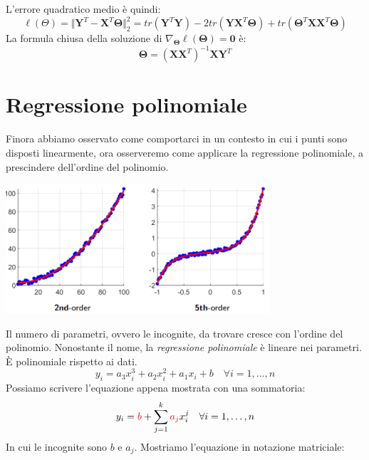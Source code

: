 \documentclass{article}
\begin{document}
        L'errore quadratico medio è quindi:
        \[\ell(\Theta) = \Vert \mathbf{Y}^T - \mathbf{X}^T \mathbf{\Theta} \Vert_2^2 = tr(\mathbf{Y}^T\mathbf{Y}) - 2tr(\mathbf{YX}^T\mathbf{\Theta}) + tr(\mathbf{\Theta}^T \mathbf{XX}^T \mathbf{\Theta}) \]
        La formula chiusa della soluzione di $\nabla_\mathbf{\Theta}\ell(\mathbf{\Theta}) = \mathbf{0}$ è:
        \[\mathbf{\Theta} = (\mathbf{XX}^T)^{-1}\mathbf{XY}^T\]

    \section{Regressione polinomiale}
        Finora abbiamo osservato come comportarci in un contesto in cui i punti sono disposti linearmente, ora osserveremo come applicare 
        la regressione polinomiale, a prescindere dell'ordine del polinomio.
        \begin{center}\includegraphics[width=9.8cm]{pol_regr.png}\end{center}
        Il numero di parametri, ovvero le incognite, da trovare cresce con l'ordine del polinomio. Nonostante il nome, la 
        \emph{regressione polinomiale} è lineare nei parametri. È polinomiale rispetto ai dati.
            \[y_i = a_3x_i^3 + a_2x^2_i + a_1x_i + b \quad \forall i=1,\dots,n \]
        Possiamo scrivere l'equazione appena mostrata con una sommatoria:
            \[y_i = \textcolor{red}{b} + \sum_{j=1}^k \textcolor{red}{a_j}x_i^j \quad \forall i=1,\dots,n \]
        In cui le incognite sono $b$ e $a_j$. Mostriamo l'equazione in notazione matriciale:
\end{document}
